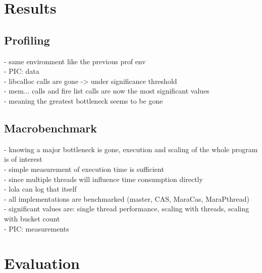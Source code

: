 \section{Results}
\subsection{Profiling}
- same environment like the previous prof env\\
- PIC: data\\
- libcalloc calls are gone -> under significance threshold\\
- mem... calls and fire list calls are now the most significant values\\
- meaning the greatest bottleneck seems to be gone\\

\subsection{Macrobenchmark}
- knowing a major bottleneck is gone, execution and scaling of the whole program is of interest\\
- simple measurement of execution time is sufficient\\
- since multiple threads will influence time consumption directly\\
- lola can log that itself\\
- all implementations are benchmarked (master, CAS, MaraCas, MaraPthread)\\
- significant values are: single thread performance, scaling with threads, scaling with bucket count\\
- PIC: measurements\\

\section{Evaluation}